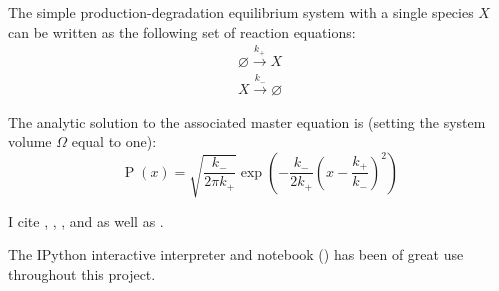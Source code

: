 \documentclass[english,letterpaper,12pt]{article}
\DeclareMathOperator{\Prob}{P}
\begin{document}
The simple production-degradation equilibrium system with a single species $X$ can be written as the following set of reaction equations:
\begin{align}
    \varnothing \xrightarrow{k_+} X \\
    X \xrightarrow {k_-} \varnothing
    \label{eq:prod-deg-rxn}
\end{align}

The analytic solution to the associated master equation is (setting the system volume $\Omega$ equal to one):
\begin{equation}
    \Prob(x) = \sqrt{\frac{k_-}{2\pi k_+}}\exp\left( -\frac{k_-}{2k_+} \left( x - \frac{k_+}{k_-} \right)^2 \right)
    \label{eq:prod-deg-ans}
\end{equation}

I cite \cite{bistable-modeling}, \cite{we-exact}, \cite{we-chemkin}, and \cite{delay-oscillations} as well as \cite{gillespie-ssa}.

The IPython interactive interpreter and notebook (\cite{PER-GRA:2007}) has been of great use throughout this project.

\lipsum[3-4]




\end{document}
